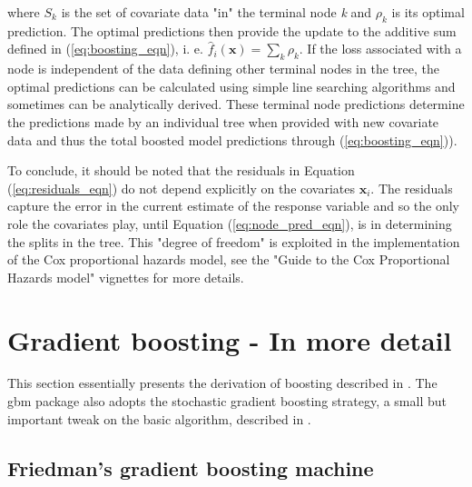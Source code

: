 \documentclass{article}
\begin{document}
where $S_{k}$ is the set of covariate data "in" the terminal node \textit{k} and $\rho_k$ is its optimal prediction.  The optimal predictions then provide the update to the additive sum defined in (\ref{eq:boosting_eqn}), i. e. $\hat{f}_i(\mathbf{x}) = \sum_k \rho_k$.  If the loss associated with a node is independent of the data defining other terminal nodes in the tree, the optimal predictions can be calculated using simple line searching algorithms and sometimes can be analytically derived.  These terminal node predictions determine the predictions made by an individual tree when provided with new covariate data and thus the total boosted model predictions through (\ref{eq:boosting_eqn})).


To conclude, it should be noted that the residuals in Equation (\ref{eq:residuals_eqn}) do not depend explicitly on the covariates $\mathbf{x}_{i}$.  The residuals capture the error in the current estimate of the response variable and so the only role the covariates play, until Equation (\ref{eq:node_pred_eqn}), is in determining the splits in the tree.  This "degree of freedom" is exploited in the implementation of the Cox proportional hazards model, see the "Guide to the Cox Proportional Hazards model" vignettes for more details.

\section{Gradient boosting - In more detail}

This section essentially presents the derivation of boosting described
in \cite{Friedman:2001}. The gbm package also adopts the stochastic
gradient boosting strategy, a small but important tweak on the basic
algorithm, described in \cite{Friedman:2002}.

\subsection{Friedman's gradient boosting machine} \label{sec:GradientBoostingMachine}
\end{document}

